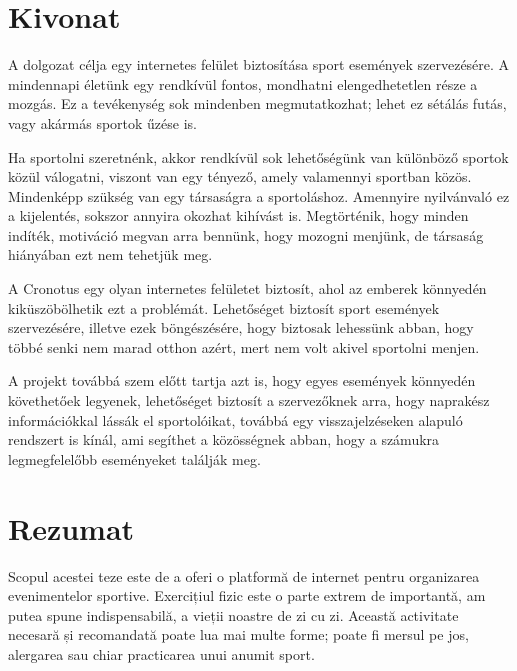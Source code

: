 
\hungarianParagraph


\chapter*{Kivonat}

A dolgozat célja egy internetes felület biztosítása sport események szervezésére. A mindennapi életünk egy rendkívül fontos, mondhatni elengedhetetlen része a mozgás. Ez a tevékenység sok mindenben megmutatkozhat; lehet ez sétálás futás, vagy akármás sportok űzése is.

Ha sportolni szeretnénk, akkor rendkívül sok lehetőségünk van különböző sportok közül válogatni, viszont van egy tényező, amely valamennyi sportban közös. Mindenképp szükség van egy társaságra a sportoláshoz. Amennyire nyilvánvaló ez a kijelentés, sokszor annyira okozhat kihívást is. Megtörténik, hogy minden indíték, motiváció megvan arra bennünk, hogy mozogni menjünk, de társaság hiányában ezt nem tehetjük meg.

A Cronotus egy olyan internetes felületet biztosít, ahol az emberek könnyedén kiküszöbölhetik ezt a problémát. Lehetőséget biztosít sport események szervezésére, illetve ezek böngészésére, hogy biztosak lehessünk abban, hogy többé senki nem marad otthon azért, mert nem volt akivel sportolni menjen.

A projekt továbbá szem előtt tartja azt is, hogy egyes események könnyedén követhetőek legyenek, lehetőséget biztosít a szervezőknek arra, hogy naprakész információkkal lássák el sportolóikat, továbbá egy visszajelzéseken alapuló rendszert is kínál, ami segíthet a közösségnek abban, hogy a számukra legmegfelelőbb eseményeket találják meg.



\vfill
{}

\chapter*{Rezumat}

Scopul acestei teze este de a oferi o platformă de internet pentru organizarea evenimentelor sportive. Exercițiul fizic este o parte extrem de importantă, am putea spune indispensabilă, a vieții noastre de zi cu zi. Această activitate necesară și recomandată poate lua mai multe forme; poate fi mersul pe jos, alergarea sau chiar practicarea unui anumit sport.

